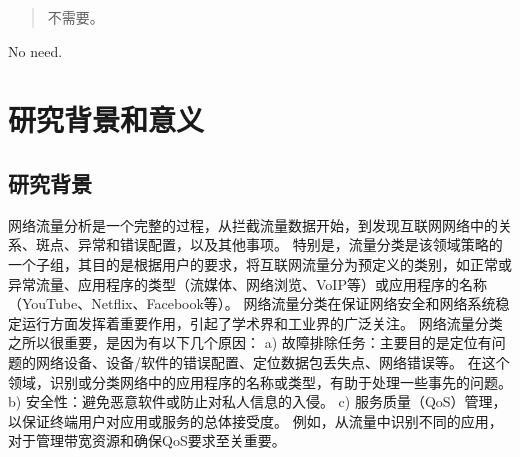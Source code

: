 \documentclass[degree=master,cjk-font=noto]{thuthesis}
\begin{document}
\maketitle

\frontmatter
\begin{abstract}
  不需要。

\end{abstract}

\begin{abstract*}
  No need.

\end{abstract*}


\tableofcontents

\listoffiguresandtables

\mainmatter

\chapter{研究背景和意义}

\section{研究背景}

网络流量分析是一个完整的过程，从拦截流量数据开始，到发现互联网网络中的关系、斑点、异常和错误配置，以及其他事项。
特别是，流量分类是该领域策略的一个子组，其目的是根据用户的要求，将互联网流量分为预定义的类别，如正常或异常流量、应用程序的类型（流媒体、网络浏览、VoIP等）或应用程序的名称（YouTube、Netflix、Facebook等）。
网络流量分类在保证网络安全和网络系统稳定运行方面发挥着重要作用，引起了学术界和工业界的广泛关注。
网络流量分类之所以很重要，是因为有以下几个原因：
a) 故障排除任务：主要目的是定位有问题的网络设备、设备/软件的错误配置、定位数据包丢失点、网络错误等。
在这个领域，识别或分类网络中的应用程序的名称或类型，有助于处理一些事先的问题。
b) 安全性：避免恶意软件或防止对私人信息的入侵。
c) 服务质量（QoS）管理，以保证终端用户对应用或服务的总体接受度。
例如，从流量中识别不同的应用，对于管理带宽资源和确保QoS要求至关重要。
\end{document}
